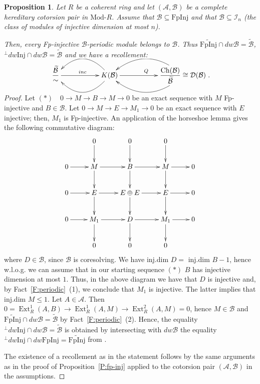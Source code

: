 \documentclass[11pt,a4paper,reqno]{amsart}
\newcommand{\Ext}{\operatorname{Ext}}
\newcommand{\A}{\mathcal{A}}
\newcommand{\B}{\mathcal{B}}
\newcommand{\D}{\mathcal{D}}
\newcommand{\I}{\mathcal{I}}
\newcommand{\Ch}{\mathrm{Ch}}
\newcommand{\Modr}[1]{\mathrm{Mod}\textrm{-}{#1}}
\newcommand{\Inj}{\mathrm{Inj}}
\newcommand{\FpInj}{\mathrm{FpInj}}
\theoremstyle{plain}
\newtheorem{prop}[thm]{Proposition}
\theoremstyle{definition}
\theoremstyle{remark}
\begin{document}
%
%
%
%
%
%
%
%
%
%
%
%

\begin{prop}\label{P:B-inj-n} Let $R$ be a coherent ring and let $(\A, \B)$ be a complete hereditary cotorsion pair in $\Modr R$. Assume that $\B\subseteq \FpInj$ and that $\B\subseteq \I_n$ (the class of modules of injective dimension at most $n$).

 Then, every Fp-injective  $\B$-periodic module belongs to $\B$. Thus
 $\widetilde{\FpInj}\cap dw \B=\tilde{\B}$, $ ^\perp dw\Inj \cap dw\B=\tilde{\B}$ and we have a recollement:
%
\vskip0.7cm
\[
\xymatrix{\dfrac{ \widetilde{\B}}{\sim} \ar[rr]^{inc} &&{K(\B)} \ar@/^2pc/[ll]\ar@/_2pc/[ll] \ar[rr]^{Q}
&&{\dfrac{\Ch(\B)}{ \widetilde{\B}}\cong \D(\B)}\ar@/^2pc/ [ll] \ar@/_2pc/ [ll] }
.\]
\vskip0.7cm

%
%
\end{prop}
 \begin{proof} Let $(\ast)\quad 0\to M\to B\to M\to 0$ be an exact sequence with $M$ Fp-injective and $B\in \B$. Let $ 0\to M\to E\to M_1\to 0$ be an exact sequence with $E$ injective; then, $M_1$ is Fp-injective. An application of the horseshoe lemma gives the following commutative diagram:
 \[\xymatrix{
&0 \ar[d]  & 0 \ar[d] & 0 \ar[d] \\
0 \ar[r] & M \ar[d] \ar[r] &B\ar[r] \ar[d] & M\ar[d]  \ar[r] & 0 \\
0 \ar[r] & E \ar[d] \ar[r] &E\oplus E\ar[r] \ar[d] & E\ar[d]  \ar[r] & 0  \\
0 \ar[r] & M_1 \ar[d]\ar[r] &D\ar[r] \ar[d] & M_1\ar[d]  \ar[r] & 0 \\
&0 & 0 & 0
}
\]
where  $D\in \B$, since $\B$ is coresolving. We have inj.dim $D=$ inj.dim $B-1$, hence w.l.o.g. we can assume that in our starting sequence  $(\ast)$ $B$ has injective dimension at most $1$. Thus, in the above diagram we have that $D$ is injective and, by Fact~\ref{F:periodic}~(1), we conclude that $M_1$ is injective. The latter implies that inj.dim $M\leq 1$.
Let $A\in \A.$ Then $0=\Ext^1_R(A, B)\to \Ext^1_R(A, M)\to \Ext^2_R(A, M)=0$, hence $M\in \B$ and
$\widetilde{\FpInj}\cap dw \B=\tilde{\B}$  by Fact~\ref{F:periodic}~(2).  Hence, the equality $ ^\perp dw\Inj \cap dw\B=\tilde{\B}$ is obtained by intersecting with $dw\B$ the equality $^\perp{} dw\Inj\cap dw \FpInj=\widetilde{\FpInj}$ from \cite[Proposition 6.11 ]{Stopurity}.

The existence of a recollement as in the statement follows by the same arguments as in the proof of Proposition~\ref{P:fp-inj} applied to the cotorsion pair $(\A, \B)$ in the assumptions.\end{proof}
\end{document}
